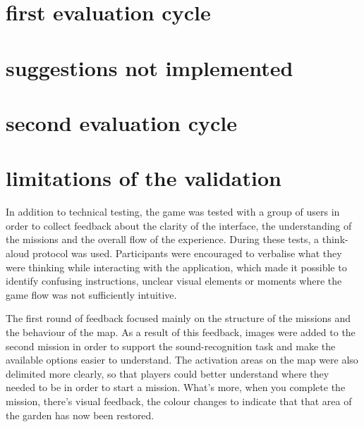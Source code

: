 \section{first evaluation cycle}

\section{suggestions not implemented}

\section{second evaluation cycle} 

\section{limitations of the validation} 

In addition to technical testing, the game was tested with a group of users in order to collect feedback about the clarity of the interface, the understanding of the missions and the overall flow of the experience. During these tests, a think-aloud protocol was used. Participants were encouraged to verbalise what they were thinking while interacting with the application, which made it possible to identify confusing instructions, unclear visual elements or moments where the game flow was not sufficiently intuitive.

The first round of feedback focused mainly on the structure of the missions and the behaviour of the map. As a result of this feedback, images were added to the second mission in order to support the sound-recognition task and make the available options easier to understand. The activation areas on the map were also delimited more clearly, so that players could better understand where they needed to be in order to start a mission. What’s more, when you complete the mission, there’s visual feedback, the colour changes to indicate that that area of the garden has now been restored.

